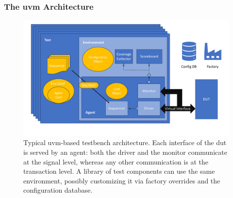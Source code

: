 \subsubsection{The \acs{uvm} Architecture}\label{subsubsec:uvm_arch}

\begin{figure}
    \centering
    \includegraphics[width=\linewidth]{fig/uvm_architecture.pdf}
    \caption{Typical \acs{uvm}-based testbench architecture. Each interface of the \acs{dut} is served by an agent: both the driver and the monitor communicate at the signal level, whereas any other communication is at the transaction level. A library of test components can use the same environment, possibly customizing it via factory overrides and the configuration database.}
    \label{fig:generic-uvm-arch}
\end{figure}

